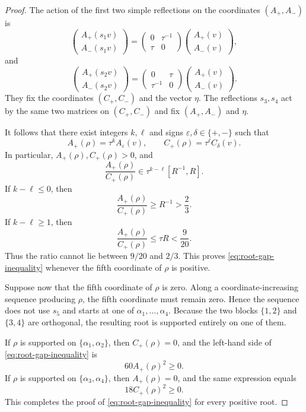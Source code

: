 \documentclass[11pt,reqno]{amsart}
\theoremstyle{plain}
\theoremstyle{definition}
\theoremstyle{remark}
\numberwithin{equation}{section}
\begin{document}
\begin{proof}
The action of the first two simple reflections on the
coordinates $(A_+,A_-)$ is
\[
\begin{pmatrix}
A_+(s_1v)\\
A_-(s_1v)
\end{pmatrix}
=
\begin{pmatrix}
0&\tau^{-1}\\
\tau&0
\end{pmatrix}
\begin{pmatrix}
A_+(v)\\
A_-(v)
\end{pmatrix},
\]
and
\[
\begin{pmatrix}
A_+(s_2v)\\
A_-(s_2v)
\end{pmatrix}
=
\begin{pmatrix}
0&\tau\\
\tau^{-1}&0
\end{pmatrix}
\begin{pmatrix}
A_+(v)\\
A_-(v)
\end{pmatrix}.
\]
They fix the coordinates $(C_+,C_-)$ and the vector $\eta$.
The reflections $s_3,s_4$ act by the same two matrices on
$(C_+,C_-)$ and fix $(A_+,A_-)$ and $\eta$.

It follows that there exist integers $k,\ell$ and signs
$\varepsilon,\delta\in\{+,-\}$ such that
\[
A_+(\rho)=\tau^k A_\varepsilon(v),
\qquad
C_+(\rho)=\tau^\ell C_\delta(v).
\]
In particular, $A_+(\rho),C_+(\rho)>0$, and
\[
\frac{A_+(\rho)}{C_+(\rho)}
\in
\tau^{k-\ell}[R^{-1},R].
\]
If $k-\ell\leq 0$, then
\[
\frac{A_+(\rho)}{C_+(\rho)}
\geq R^{-1}>\frac23.
\]
If $k-\ell\geq 1$, then
\[
\frac{A_+(\rho)}{C_+(\rho)}
\leq \tau R<\frac9{20}.
\]
Thus the ratio cannot lie between $9/20$ and $2/3$.
This proves \eqref{eq:root-gap-inequality} whenever the
fifth coordinate of $\rho$ is positive.

Suppose now that the fifth coordinate of $\rho$ is zero.
Along a coordinate-increasing sequence producing $\rho$,
the fifth coordinate must remain zero. Hence the sequence
does not use $s_5$ and starts at one of
$\alpha_1,\ldots,\alpha_4$.
Because the two blocks $\{1,2\}$ and $\{3,4\}$ are orthogonal,
the resulting root is supported entirely on one of them.

If $\rho$ is supported on $\{\alpha_1,\alpha_2\}$, then
$C_+(\rho)=0$, and the left-hand side of
\eqref{eq:root-gap-inequality} is
\[
60A_+(\rho)^2\geq 0.
\]
If $\rho$ is supported on $\{\alpha_3,\alpha_4\}$, then
$A_+(\rho)=0$, and the same expression equals
\[
18C_+(\rho)^2\geq 0.
\]
This completes the proof of
\eqref{eq:root-gap-inequality} for every positive root.


\end{proof}
\end{document}
